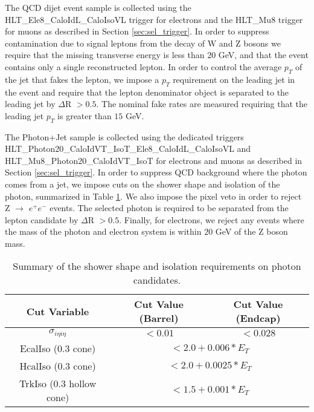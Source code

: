 The QCD dijet event sample is collected using the {HLT\_Ele8\_CaloIdL\_CaloIsoVL } 
trigger for electrons and the { HLT\_Mu8 } trigger for muons as described 
in Section \ref{sec:sel_trigger}. In order to suppress 
contamination due to signal leptons from the decay of W and Z bosons we require
that the missing transverse energy is less than $20$ GeV, and that the event contains 
only a single reconstructed lepton. In order to control the average $p_{T}$ of the
jet that fakes the lepton, we impose a $p_{T}$ requirement on the leading jet
in the event and require that the lepton denominator object is 
separated to the leading jet by $\Delta$R $ > 0.5$. The nominal fake rates are measured
requiring that the leading jet $p_{T}$ is greater than $15$ GeV. 

The Photon+Jet sample is collected using the dedicated triggers \\
{HLT\_Photon20\_CaloIdVT\_IsoT\_Ele8\_CaloIdL\_CaloIsoVL} and 
{HLT\_Mu8\_Photon20\_CaloIdVT\_IsoT} for electrons and muons
as described in Section \ref{sec:sel_trigger}.
In order to suppress QCD background where the photon comes from a 
jet, we impose cuts on the shower shape and isolation of the photon, 
summarized in Table \ref{tab:photonOfflineSelection}. We also impose the pixel veto in order to reject
Z $\rightarrow$ $e^{+}e^{-}$ events. The selected photon is required to
be separated from the lepton candidate by $\Delta$R $ > 0.5$. Finally, 
for electrons, we reject any events where the mass of the photon and
electron system is within $20$ GeV of the Z boson mass. 

\begin{table}[!ht]
\begin{center}
\begin{tabular}{|c|c|c|}
\hline
 Cut Variable           &   Cut Value (Barrel)        & Cut Value (Endcap)     \\
\hline
 $\sigma_{i\eta i\eta}$      &   $<0.01$              & $<0.028$               \\ 
\hline
 EcalIso (0.3 cone)          &   \multicolumn{2}{|c|}{$<2.0 + 0.006*E_{T}$}    \\ 
 HcalIso (0.3 cone)          &   \multicolumn{2}{|c|}{$<2.0 + 0.0025*E_{T}$}   \\ 
 TrkIso (0.3 hollow cone)    &   \multicolumn{2}{|c|}{$<1.5 + 0.001*E_{T}$}    \\ 
\hline
\end{tabular}
\caption{Summary of the shower shape and isolation requirements on 
photon candidates. \label{tab:photonOfflineSelection}}
\end{center}
\end{table}

